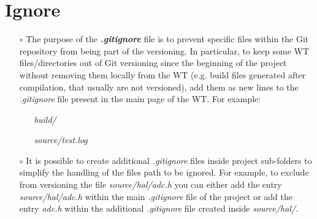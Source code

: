 \documentclass[a4paper,portrait,10pt]{article}   %
\newcommand{\myvspace}{\vspace{4mm}}   %
\begin{document}

\section{Ignore}   \label{sec:Ignore}

\begin{itemize}
\item[$\circ$] The purpose of the \textbf{\textit{.gitignore}} file is to prevent specific files within the Git repository from being part of the versioning. In particular, to keep some WT files/directories out of Git versioning since the beginning of the project without removing them locally from the WT (e.g. build files generated after compilation, that usually are not versioned), add them as new lines to the \textit{.gitignore} file present in the main page of the WT. For example:
\begin{itemize}
  \item[] \textit{build/}
  \item[] \textit{source/test.log}
\end{itemize}
\myvspace

\item[$\circ$] It is possible to create additional \textit{.gitignore} files inside project sub-folders to simplify the handling of the files path to be ignored. For example, to exclude from versioning the file \textit{source/hal/adc.h} you can either add the entry \textit{source/hal/adc.h} within the main \textit{.gitignore} file of the project or add the entry \textit{adc.h} within the additional \textit{.gitignore} file created inside \textit{source/hal/}.
\myvspace


\end{itemize}
\end{document}
